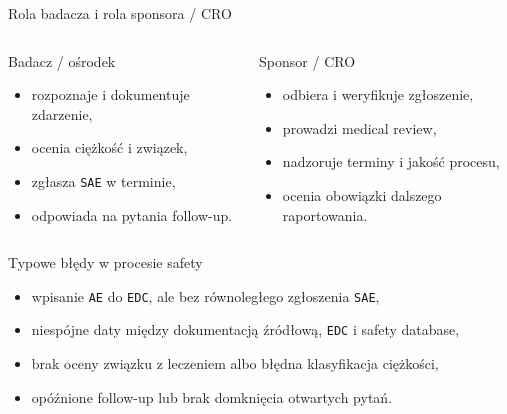 \begin{frame}{Rola badacza i rola sponsora / CRO}
  \begin{columns}[T,onlytextwidth]
    \begin{DefinitionBox}{Badacz / ośrodek}
      \begin{itemize}
        \item rozpoznaje i dokumentuje zdarzenie,
        \item ocenia ciężkość i związek,
        \item zgłasza \texttt{SAE} w terminie,
        \item odpowiada na pytania follow-up.
      \end{itemize}
    \end{DefinitionBox}
    \begin{ExampleBox}{Sponsor / CRO}
      \begin{itemize}
        \item odbiera i weryfikuje zgłoszenie,
        \item prowadzi medical review,
        \item nadzoruje terminy i jakość procesu,
        \item ocenia obowiązki dalszego raportowania.
      \end{itemize}
    \end{ExampleBox}
  \end{columns}
\end{frame}

\begin{frame}{Typowe błędy w procesie safety}
  \begin{itemize}
    \item wpisanie \texttt{AE} do \texttt{EDC}, ale bez równoległego zgłoszenia \texttt{SAE},
    \item niespójne daty między dokumentacją źródłową, \texttt{EDC} i safety database,
    \item brak oceny związku z leczeniem albo błędna klasyfikacja ciężkości,
    \item opóźnione follow-up lub brak domknięcia otwartych pytań.
  \end{itemize}
\end{frame}


